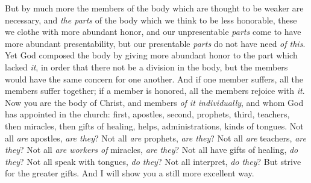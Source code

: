 \begin{biblechapter}
\verse But by much more the members of the body which are thought to be weaker are necessary,
\verse and \textit{the parts} of the body which we think to be less honorable, these we clothe with more abundant honor, and our unpresentable \textit{parts} come to have more abundant presentability,
\verse but our presentable \textit{parts} do not have need \textit{of this}. Yet God composed the body by giving more abundant honor to the part which lacked \textit{it},
\verse in order that there not be a division in the body, but the members would have the same concern for one another.
\verse And if one member suffers, all the members suffer together; if a member is honored, all the members rejoice with \textit{it}.
\verse Now you are the body of Christ, and members \textit{of it individually},
\verse and whom God has appointed in the church: first, apostles, second, prophets, third, teachers, then miracles, then gifts of healing, helps, administrations, kinds of tongues.
\verse Not all \textit{are} apostles, \textit{are they}? Not all \textit{are} prophets, \textit{are they}? Not all \textit{are} teachers, \textit{are they}? Not all \textit{are workers of} miracles, \textit{are they}?
\verse Not all have gifts of healing, \textit{do they}? Not all speak with tongues, \textit{do they}? Not all interpret, \textit{do they}?
\verse But strive for the greater gifts. And I will show you a still more excellent way.
\end{biblechapter}

